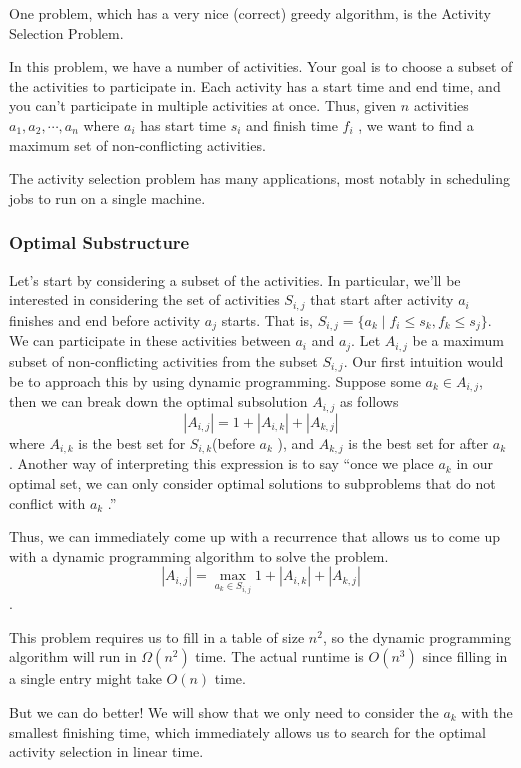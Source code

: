 \documentclass [12pt]{article}
\theoremstyle{definition}
\begin{document}
One problem, which has a very nice (correct) greedy algorithm, is the Activity Selection Problem. 

In this problem, we have a number of activities. Your goal is to choose a subset of the activities to participate in. Each activity has a start time and end time, and you can't participate in multiple activities at once. Thus, given $n$ activities $a_1, a_2, \cdots, a_n$ where $a_i$ has start time $s_i$ and finish time $f_i$ , we want to find a maximum set of non-conflicting activities. 

The activity selection problem has many applications, most notably in scheduling jobs to run on a single machine.

\subsubsection{Optimal Substructure} 

Let's start by considering a subset of the activities. In particular, we'll be interested in
considering the set of activities $S_{i ,j}$ that start after activity $a_i$ finishes and end before activity $a_j$ starts. That is, $S_{i ,j} = \{a_k \mid f_i \leq s_k , f_k \leq s_j\}$. We can participate in these activities between $a_i$ and $a_j$. Let $A_{i ,j}$ be a maximum subset of non-conflicting activities from the subset $S_{i ,j}$. Our first intuition would be to approach this by using dynamic programming. Suppose some $a_k \in A_{i ,j}$, then we can break down the optimal subsolution $A_{i ,j}$ as follows 
$$
|A_{i ,j}| = 1 + |A_{i ,k} | + |A_{k ,j}| 
$$
where $A_{i ,k}$ is the best set for $S_{i ,k}$(before $a_k$ ), and $A_{k ,j}$ is the best set for after $a_k$ . Another way of interpreting this expression is to say ``once we place $a_k$ in our optimal set, we can only consider optimal solutions to subproblems that do not conflict with $a_k$ .''

Thus, we can immediately come up with a recurrence that allows us to come up with a dynamic programming algorithm to solve the problem. 
$$
|A_{i ,j}| = \max_{a_k \in S_{i ,j}} 1 + |A_{i ,k} | + |A_{k ,j}|
$$.

This problem requires us to fill in a table of size $n^2$, so the dynamic programming algorithm will run in $\Omega(n^2)$ time. The actual runtime is $O(n^3)$ since filling in a single entry might take $O(n)$ time. 

But we can do better! We will show that we only need to consider the $a_k$ with the smallest finishing time, which immediately allows us to search for the optimal activity selection in linear time.
\end{document}
